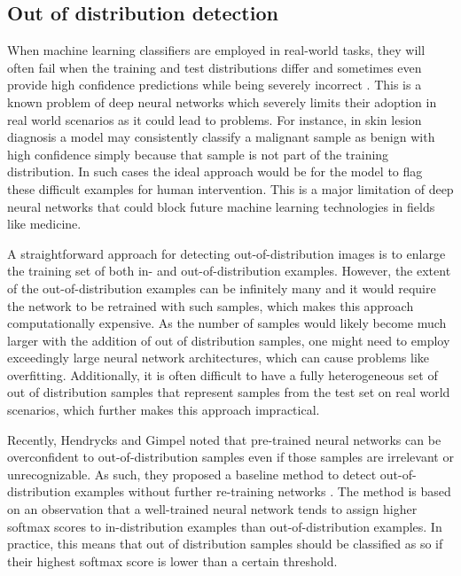     
\subsection{Out of distribution detection}
    When machine learning classifiers are employed in real-world tasks, they will often fail when the training and test distributions differ and sometimes even provide high confidence predictions while being severely incorrect \cite{Goodfellow2015}\cite{Amodei2016}. This is a known problem of deep neural networks which severely limits their adoption in real world scenarios as it could lead to problems. For instance, in skin lesion diagnosis a model may consistently classify a malignant sample as benign with high confidence simply because that sample is not part of the training distribution. In such cases the ideal approach would be for the model to flag these difficult examples for human intervention. This is a major limitation of deep neural networks that could block future machine learning technologies in fields like medicine. \par
    
    A straightforward approach for detecting out-of-distribution images is to enlarge the training set of both in- and out-of-distribution examples. However, the extent of the out-of-distribution examples can be infinitely many and it would require the network to be retrained with such samples, which makes this approach computationally expensive. As the number of samples would likely become much larger with the addition of out of distribution samples, one might need to employ exceedingly large neural network architectures, which can cause problems like overfitting. Additionally, it is often difficult to have a fully heterogeneous set of out of distribution samples that represent samples from the test set on real world scenarios, which further makes this approach impractical. \par

    Recently, Hendrycks and Gimpel noted that pre-trained neural networks can be overconfident to out-of-distribution samples even if those samples are irrelevant or unrecognizable. As such, they proposed a baseline method to detect out-of-distribution examples without further re-training networks \cite{Hendrycks2019}. The method is based on an observation that a well-trained neural network tends to assign higher softmax scores to in-distribution examples than out-of-distribution examples. In practice, this means that out of distribution samples should be classified as so if their highest softmax score is lower than a certain threshold. \par
    
